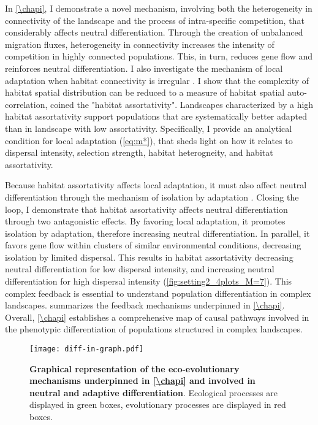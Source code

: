 In \cref{\chapi}, I demonstrate a novel mechanism, involving both the heterogeneity in connectivity of the landscape and the process of intra-specific competition, that considerably affects neutral differentiation. Through the creation of unbalanced migration fluxes, heterogeneity in connectivity increases the intensity of competition in highly connected populations. This, in turn, reduces gene flow and reinforces neutral differentiation.
% 
I also investigate the mechanism of local adaptation when habitat connectivity is irregular \citep{Dale2010,LiebermanHauert2005}. I show that the complexity of habitat spatial distribution can be reduced to a measure of habitat spatial auto-correlation, coined the "habitat assortativity". Landscapes characterized by a high habitat assortativity support populations that are systematically better adapted than in landscape with low assortativity. Specifically, I provide an analytical condition for local adaptation  (\cref{eq:m*}), that sheds light on how it relates to dispersal intensity, selection strength, habitat heterogneity, and habitat assortativity.

Because habitat assortativity affects local adaptation, it must also affect neutral differentiation through the mechanism of isolation by adaptation \citep{Orsini2013}. Closing the loop, I demonstrate that habitat assortativity affects neutral differentiation through two antagonistic effects. By favoring local adaptation, it promotes isolation by adaptation, therefore increasing neutral differentiation. In parallel, it favors gene flow within clusters of similar environmental conditions, decreasing isolation by limited dispersal. This results in habitat assortativity decreasing neutral differentiation for low dispersal intensity, and increasing neutral differentiation for high dispersal intensity (\cref{fig:setting2_4plots_M=7}).
% 
This complex feedback is essential to understand population differentiation in complex landscapes.
% 
 summarizes the feedback mechanisms underpinned in \cref{\chapi}. Overall, \cref{\chapi} establishes a comprehensive map of causal pathways involved in the phenotypic differentiation of populations structured in complex landscapes. 

\begin{figure}[t]
    \centering
    \texttt{[image: diff-in-graph.pdf]}
    \caption{\textbf{Graphical representation of the eco-evolutionary mechanisms underpinned in \cref{\chapi} and involved in neutral and adaptive differentiation}. Ecological processes are displayed in green boxes, evolutionary processes are displayed in red boxes.}
    \label{fig:summary_diff-in-graph}
\end{figure}


